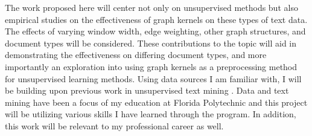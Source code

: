 The work proposed here will center not only on unsupervised methods but also empirical studies on the effectiveness of graph kernels on these types of text data. The effects of varying window width, edge weighting, other graph structures, and document types will be considered. These contributions to the topic will aid in demonstrating the effectiveness on differing document types, and more importantly an exploration into using graph kernels as a preprocessing method for unsupervised learning methods. Using data sources I am familiar with, I will be building upon previous work in unsupervised text mining \cite{akioyamen2020framework}. Data and text mining have been a focus of my education at Florida Polytechnic and this project will be utilizing various skills I have learned through the program. In addition, this work will be relevant to my professional career as well.





